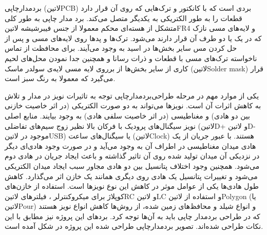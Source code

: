 برد‌مدارچاپی (‌لاتین{PCB}) بردی است که با کانکتور و ترک‌هایی که روی آن قرار دارد قطعات را به طور الکتریکی به یکدیگر متصل می‌کند. برد مدار چاپی به طور کلی متشکل از هسته‌ای محکم معمولا از جنس فیبرشیشه ‌لاتین{FR4} و لایه‌های مسی نازک که در یک یا دو طرف آن قرار دارند می‌شود. ترک‌ها و پد‌ها روی لایه‌های مسی و پس از حل کردن مس سایر بخش‌ها در اسید به وجود می‌آیند. برای محافظت از تماس ناخواسته ترک‌های مسی با قطعات و ذرات رسانا و همچنین جدا نمودن محل‌های لحیم کاری از سایر بخش‌ها از برروی لایه مسی لایه‌ی سولدر ماسک (‌لاتین{Solder mask}) قرار می‌گیرد که معمولا به رنگ سبز است.

یکی از موارد مهم در مرحله طراحی‌بردمدارچاپی توجه به تاثیرات نویز در مدار و تلاش به کاهش اثرات آن است. نویز‌ها می‌تواند به دو صورت الکتریکی (در اثر خاصیت خازنی بین دو هادی) و مغناطیسی (در اثر خاصیت سلفی هادی) به وجود بیایند. منابع اصلی نویز سیگنال‌های پرودیک با فرکان بالا نظیر زوج سیم‌های تفاضلی (‌لاتین{D+} و ‌لاتین{D-} موجود در ‌لاتین{USB}) یا سیگنال‌های ساعت (‌لاتین{Clock}) هستند. با عبور جریان از یک هادی میدان مغناطیسی در اطراف آن به وجود می‌آید و در صورت وجود هادی‌ای دیگر در نزدیکی آن میدان تولید شده روی آن تاثیر گذاشته و باعث ایجاد جریان در هادی دوم می‌شود. همچنین وجود اختلاف پتانسیل بین دو هادی مجاور سبب ایجاد میدان الکتریکی می‌شود و تغییرات پتانسیل یک هادی روی دیگری همانند یک خازن اثر می‌گذارد. کاهش طول هادی‌ها یکی از عوامل موثر در کاهش این نوع نویز‌ها است. استفاده از خازن‌های کوپلاژ برای میکروکنترلر ، فیلتر‌های ‌لاتین{RC} و ‌لاتین{LC} و استفاده از ‌لاتین{Polygon} (یا ‌لاتین{Pour}) و انواع شیلد و محافظ‌های زمین شده، از روش‌ها کاهش انواع نویز هستند که در طراحی بردمدار چاپی باید به آن‌ها توجه کرد. برد‌های این پروژه نیز مطابق با این نکات طراحی شده‌اند. تصویر برد‌مدار‌‌چاپی طراحی شده این پروژه در شکل  آمده است.

